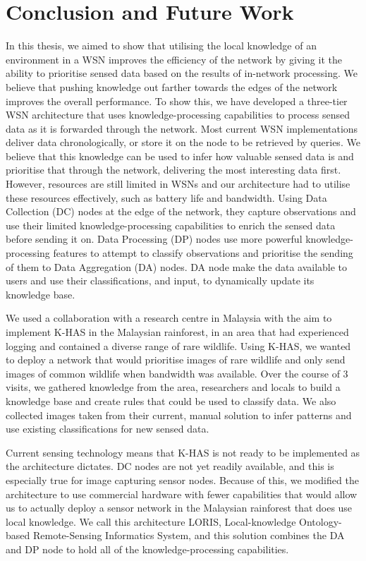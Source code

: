 
\chapter{Conclusion and Future Work}
In this thesis, we aimed to show that utilising the local knowledge of an environment in a WSN improves the efficiency of the network by giving it the ability to prioritise sensed data based on the results of in-network processing.  We believe that pushing knowledge out farther towards the edges of the network improves the overall performance. To show this, we have developed a three-tier WSN architecture that uses knowledge-processing capabilities to process sensed data as it is forwarded through the network. Most current WSN implementations deliver data chronologically, or store it on the node to be retrieved by queries. We believe that this knowledge can be used to infer how valuable sensed data is and prioritise that through the network, delivering the most interesting data first. However, resources are still limited in WSNs and our architecture had to utilise these resources effectively, such as battery life and bandwidth. Using Data Collection (DC) nodes at the edge of the network, they capture observations and use their limited knowledge-processing capabilities to enrich the sensed data before sending it on. Data Processing (DP) nodes use more powerful knowledge-processing features to attempt to classify observations and prioritise the sending of them to Data Aggregation (DA) nodes. DA node make the data available to users and use their classifications, and input, to dynamically update its knowledge base.

We used a collaboration with a research centre in Malaysia with the aim to implement K-HAS in the Malaysian rainforest, in an area that had experienced logging and contained a diverse range of rare wildlife. Using K-HAS, we wanted to deploy a network that would prioritise images of rare wildlife and only send images of common wildlife when bandwidth was available.  Over the course of 3 visits, we gathered knowledge from the area, researchers and locals to build a knowledge base and create rules that could be used to classify data. We also collected images taken from their current, manual solution to infer patterns and use existing classifications for new sensed data.

Current sensing technology means that K-HAS is not ready to be implemented as the architecture dictates. DC nodes are not yet readily available, and this is especially true for image capturing sensor nodes. Because of this, we modified the architecture to use commercial hardware with fewer capabilities that would allow us to actually deploy a sensor network in the Malaysian rainforest that does use local knowledge. We call this architecture LORIS, Local-knowledge Ontology-based Remote-Sensing Informatics System, and this solution combines the DA and DP node to hold all of the knowledge-processing capabilities.

